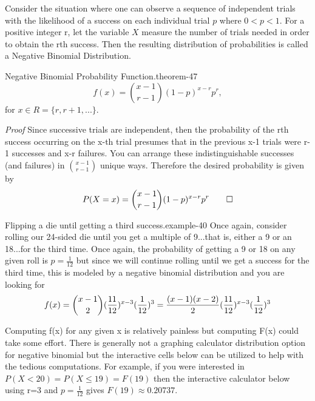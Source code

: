 \documentclass[10pt,]{book}
\makeatletter
\renewcommand*{\proofname}{Proof}
\renewenvironment{proof}[1][\proofname]{\par
  \pushQED{\qed}%
  \normalfont \topsep6\p@\@plus6\p@\relax
  \trivlist
  \item\relax
    {\itshape
    #1\@addpunct{.}}\hspace\labelsep\ignorespaces
}{%
  \popQED\endtrivlist\@endpefalse
}
\numberwithin{equation}{section}
\newcommand{\lt}{<}
\makeatother
\begin{document}
%
\par
\hypertarget{p-963}{}%
Consider the situation where one can observe a sequence  of independent trials with the likelihood of a success on each individual trial \(p\) where \(0 \lt p \lt 1 \). For a positive integer r, let the variable \(X\) measure the number of trials needed in order to obtain the rth success. Then the resulting distribution of probabilities is called a Negative Binomial Distribution.%
\par
\hypertarget{p-964}{}%
\begin{theorem}{Negative Binomial Probability Function.}{}{theorem-47}%
\hypertarget{NegativeBinomialProbabilityFunction}{}%
%
\begin{equation*}
f(x) = \binom{x - 1}{r-1}(1-p)^{x-r}p^r,
\end{equation*}
for \(x \in R = \{r, r+1, ... \}\).%
\end{theorem}
\begin{proof}\hypertarget{proof-49}{}
\hypertarget{p-966}{}%
Since successive trials are independent, then the probability of the rth success occurring on the x-th trial presumes that in the previous x-1 trials were r-1 successes and x-r failures. You can arrange these indistinguishable successes (and failures) in \(\binom{x-1}{r-1}\) unique ways. Therefore the desired probability is given by%
\begin{equation*}
P(X=x) = \binom{x - 1}{r-1}(1-p)^{x-r}p^r\qedhere
\end{equation*}
%
\end{proof}
%
\begin{example}{Flipping a die until getting a third success.}{example-40}%
\hypertarget{p-967}{}%
Once again, consider rolling our 24-sided die until you get a multiple of 9...that is, either a 9 or an 18...for the third time. Once again, the probability of getting a 9 or 18 on any given roll is \(p = \frac{1}{12}\) but since we will continue rolling until we get a success for the third time, this is modeled by a negative binomial distribution and you are looking for%
\begin{equation*}
f(x) = \binom{x-1}{2}(\frac{11}{12})^{x-3} (\frac{1}{12})^3  \\
= \frac{(x-1)(x-2)}{2}(\frac{11}{12})^{x-3} (\frac{1}{12})^3
\end{equation*}
%
\par
\hypertarget{p-968}{}%
Computing f(x) for any given x is relatively painless but computing F(x) could take some effort. There is generally not a graphing calculator distribution option for negative binomial but the interactive cells below can be utilized to help with the tedious computations. For example, if you were interested in \(P(X \lt 20) = P(X \le 19 ) = F(19)\) then the interactive calculator below using r=3 and \(p = \frac{1}{12}\) gives \(F(19) \approx 0.20737.\)%
\end{example}
\end{document}
